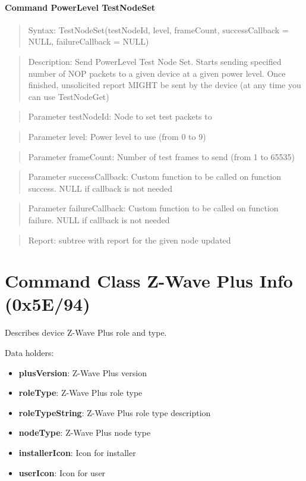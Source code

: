 \paragraph{Command PowerLevel TestNodeSet}
\begin{quote}Syntax: TestNodeSet(testNodeId, level, frameCount, successCallback = NULL, failureCallback = NULL)\end{quote}
\begin{quote}Description: Send PowerLevel Test Node Set. Starts sending specified number of NOP packets to a given device at a given power level. Once finished, unsolicited report MIGHT be sent by the device (at any time you can use TestNodeGet)\end{quote}
\begin{quote}Parameter testNodeId: Node to set test packets to\end{quote}
\begin{quote}Parameter level: Power level to use (from 0 to 9)\end{quote}
\begin{quote}Parameter frameCount: Number of test frames to send (from 1 to 65535)\end{quote}
\begin{quote}Parameter successCallback: Custom function to be called on function success. NULL if callback is not needed\end{quote}
\begin{quote}Parameter failureCallback: Custom function to be called on function failure. NULL if callback is not needed\end{quote}
\begin{quote}Report: subtree with report for the given node updated\end{quote}


\section{Command Class Z-Wave Plus Info (0x5E/94)}

Describes device Z-Wave Plus role and type.
\newline

\noindent
Data holders:

\begin{itemize}
\item \textbf{plusVersion}: Z-Wave Plus version
\item \textbf{roleType}: Z-Wave Plus role type
\item \textbf{roleTypeString}: Z-Wave Plus role type description
\item \textbf{nodeType}: Z-Wave Plus node type
\item \textbf{installerIcon}: Icon for installer
\item \textbf{userIcon}: Icon for user
\end{itemize}

